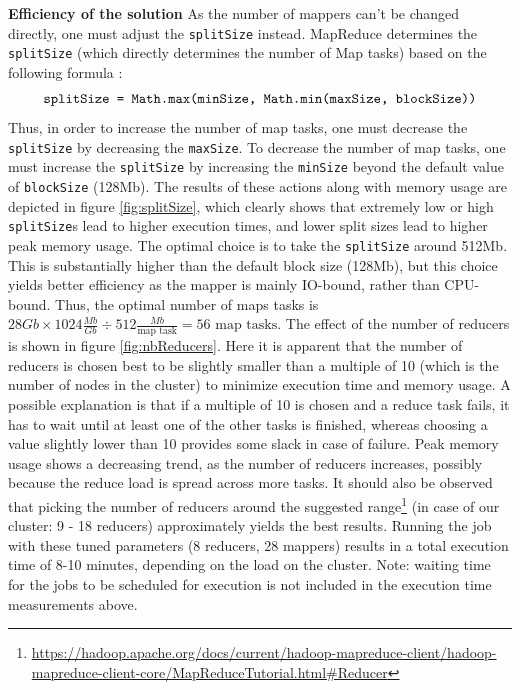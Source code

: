 \documentclass[11pt]{article}
\begin{document}
\textbf{Efficiency of the solution}
As the number of mappers can't be changed directly, one must adjust the \texttt{splitSize} instead. MapReduce determines the \texttt{splitSize} (which directly determines the number of Map tasks) based on the following formula \cite{Hadoop}:
\begin{equation*}
\texttt{\text{splitSize = Math.max(minSize, Math.min(maxSize, blockSize))}}
\end{equation*}
Thus, in order to increase the number of map tasks, one must decrease the \texttt{splitSize} by decreasing the \texttt{maxSize}. To decrease the number of map tasks, one must increase the \texttt{splitSize} by increasing the \texttt{minSize} beyond the default value of \texttt{blockSize} (128Mb). The results of these actions along with memory usage are depicted in figure \ref{fig:splitSize}, which clearly shows that extremely low or high \texttt{splitSize}s lead to higher execution times, and lower split sizes lead to higher peak memory usage. The optimal choice is to take the \texttt{splitSize} around 512Mb. This is substantially higher than the default block size (128Mb), but this choice yields better efficiency as the mapper is mainly IO-bound, rather than CPU-bound. Thus, the optimal number of maps tasks is $28Gb \times 1024 \frac{Mb}{Gb} \div 512 \frac{Mb}{\text{map task}} = 56 \text{ map tasks}$. The effect of the number of reducers is shown in figure \ref{fig:nbReducers}. Here it is apparent that the number of reducers is chosen best to be slightly smaller than a multiple of 10 (which is the number of nodes in the cluster) to minimize execution time and memory usage. A possible explanation is that if a multiple of 10 is chosen and a reduce task fails, it has to wait until at least one of the other tasks is finished, whereas choosing a value slightly lower than 10 provides some slack in case of failure. Peak memory usage shows a decreasing trend, as the number of reducers increases, possibly because the reduce load is spread across more tasks. It should also be observed that picking the number of reducers around the suggested range\footnote{\hspace{.2cm}
	\begin{minipage}{.5\textwidth}
		\url{https://hadoop.apache.org/docs/current/hadoop-mapreduce-client/hadoop-mapreduce-client-core/MapReduceTutorial.html\#Reducer}
	\end{minipage}}
(in case of our cluster: 9 - 18 reducers) approximately yields the best results. Running the job with these tuned parameters (8 reducers, 28 mappers) results in a total execution time of 8-10 minutes, depending on the load on the cluster. Note: waiting time for the jobs to be scheduled for execution is not included in the execution time measurements above.
\end{document}
